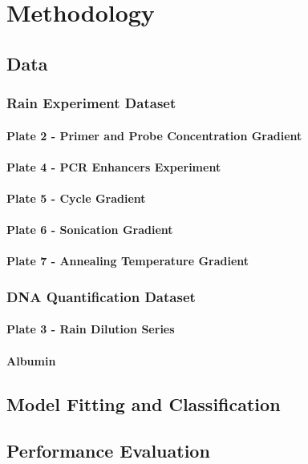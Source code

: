 \chapter{Methodology}
\label{sec:methodology} 

\section{Data}
\label{sec:data}

\subsection{Rain Experiment Dataset}
\label{sec:experimentdataset}

\subsubsection{Plate 2 - Primer and Probe Concentration Gradient}
\label{sec:plate2}

\subsubsection{Plate 4 - PCR Enhancers Experiment}
\label{sec:plate4}

\subsubsection{Plate 5 - Cycle Gradient}
\label{sec:plate5}

\subsubsection{Plate 6 - Sonication Gradient}
\label{sec:plate6}

\subsubsection{Plate 7 - Annealing Temperature Gradient}
\label{sec:plate7}

\subsection{DNA Quantification Dataset}
\label{sec:quantificationdataset}

\subsubsection{Plate 3 - Rain Dilution Series}
\label{sec:plate3}

\subsubsection{Albumin}
\label{sec:albumin}

\section{Model Fitting and Classification}
\label{sec:modelfitting}

\section{Performance Evaluation}
\label{sec:performanceeval}

